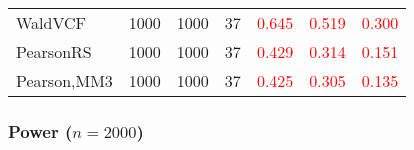 \documentclass[
]{article}
\begin{document}
\begin{table}[H]
{\begin{tabular}[t]{lrrrrrr}
\hspace{1em}WaldVCF & 1000 & 1000 & 37 & \textcolor{red}{0.645} & \textcolor{red}{0.519} & \textcolor{red}{0.300}\\
\hspace{1em}PearsonRS & 1000 & 1000 & 37 & \textcolor{red}{0.429} & \textcolor{red}{0.314} & \textcolor{red}{0.151}\\
\hspace{1em}Pearson,MM3 & 1000 & 1000 & 37 & \textcolor{red}{0.425} & \textcolor{red}{0.305} & \textcolor{red}{0.135}\\
\bottomrule
\end{tabular}}
\endgroup{}
\end{table}

\hypertarget{power-n2000-1}{%
\subsubsection{\texorpdfstring{Power
(\(n=2000\))}{Power (n=2000)}}\label{power-n2000-1}}
\end{document}
